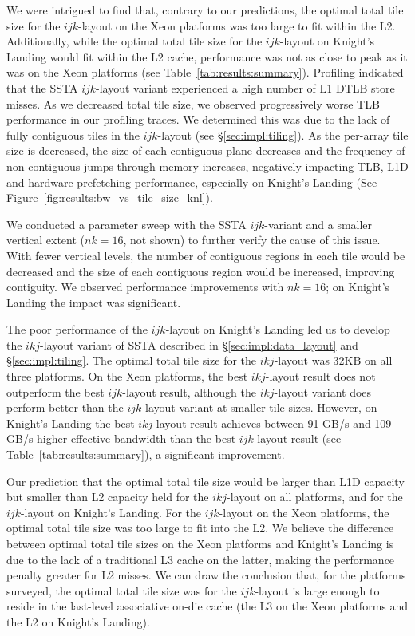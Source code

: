 \documentclass[10pt, conference, compsocconf]{IEEEtran}
\begin{document}
We were intrigued to find that, contrary to our predictions, the optimal total
  tile size for the \(ijk\)-layout on the Xeon platforms was too large to fit
  within the L2.
Additionally, while the optimal total tile size for the \(ijk\)-layout on
  Knight's Landing would fit within the L2 cache, performance was not as close to
  peak as it was on the Xeon platforms (see Table~\ref{tab:results:summary}).
Profiling indicated that the SSTA \(ijk\)-layout variant experienced a high
  number of L1 DTLB store misses.
As we decreased total tile size, we observed progressively worse TLB performance
  in our profiling traces.
We determined this was due to the lack of fully contiguous tiles in the
  \(ijk\)-layout (see \S\ref{sec:impl:tiling}). 
As the per-array tile size is decreased, the size of each contiguous
  plane decreases and the frequency of non-contiguous jumps through memory
  increases, negatively impacting TLB, L1D and hardware prefetching performance,
  especially on Knight's Landing (See
  Figure~\ref{fig:results:bw_vs_tile_size_knl}).

We conducted a parameter sweep with the SSTA \(ijk\)-variant and a smaller
  vertical extent (\(nk = 16\), not shown) to further verify the cause of this
  issue.
With fewer vertical levels, the number of contiguous regions in each tile would
  be decreased and the size of each contiguous region would be increased,
  improving contiguity.
We observed performance improvements with \(nk = 16\); on Knight's Landing
  the impact was significant.

The poor performance of the \(ijk\)-layout on Knight's Landing led us to
  develop the \(ikj\)-layout variant of SSTA described in
  \S\ref{sec:impl:data_layout} and \S\ref{sec:impl:tiling}.
The optimal total tile size for the \(ikj\)-layout was 32KB on all three
  platforms.
On the Xeon platforms, the best \(ikj\)-layout result does not outperform the
  best \(ijk\)-layout result, although the \(ikj\)-layout variant does perform
  better than the \(ijk\)-layout variant at smaller tile sizes.
However, on Knight's Landing the best \(ikj\)-layout result achieves
  between 91 GB/s and 109 GB/s higher effective bandwidth than the best
  \(ijk\)-layout result (see Table~\ref{tab:results:summary}), a significant
  improvement.

Our prediction that the optimal total tile size would be larger than L1D
  capacity but smaller than L2 capacity held for the \(ikj\)-layout on all
  platforms, and for the \(ijk\)-layout on Knight's Landing.
For the \(ijk\)-layout on the Xeon platforms, the optimal total tile size was
  too large to fit into the L2.
We believe the difference between optimal total tile sizes on the Xeon
  platforms and Knight's Landing is due to the lack of a traditional L3 cache
  on the latter, making the performance penalty greater for L2 misses.
We can draw the conclusion that, for the platforms surveyed, the optimal total
  tile size was for the \(ijk\)-layout is large enough to reside in the
  last-level associative on-die cache (the L3 on the Xeon platforms and the L2
  on Knight's Landing).
\end{document}
